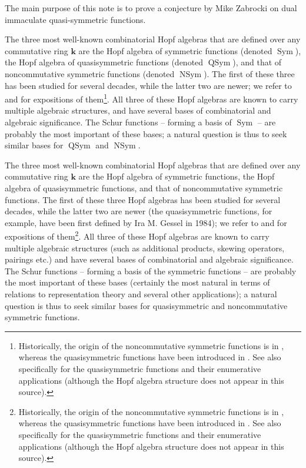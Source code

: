 \documentclass[numbers=enddot,12pt,final,onecolumn,notitlepage,abstracton]{scrartcl}%
\theoremstyle{definition}
\newenvironment{verlong}{}{}
\newenvironment{vershort}{}{}
\newenvironment{noncompile}{}{}
\begin{document}
\begin{noncompile}
The main purpose of this note is to prove a conjecture by Mike Zabrocki on
dual immaculate quasi-symmetric functions.
\end{noncompile}

\begin{vershort}
The three most well-known combinatorial Hopf algebras that are defined over
any commutative ring $\mathbf{k}$ are the Hopf algebra of symmetric functions
(denoted $\operatorname*{Sym}$), the Hopf algebra of quasisymmetric functions
(denoted $\operatorname*{QSym}$), and that of noncommutative symmetric
functions (denoted $\operatorname*{NSym}$). The first of these three has been
studied for several decades, while the latter two are newer; we refer to
\cite[Chapters 4 and 6]{HGK} and \cite[Chapters 2 and 5]{Reiner} for
expositions of them\footnote{Historically, the origin of the noncommutative
symmetric functions is in \cite{NCSF1}, whereas the quasisymmetric functions
have been introduced in \cite{Gessel}. See also \cite[Section 7.19]%
{Stanley-EC2} specifically for the quasisymmetric functions and their
enumerative applications (although the Hopf algebra structure does not appear
in this source).}. All three of these Hopf algebras are known to carry
multiple algebraic structures, and have several bases of combinatorial and
algebraic significance. The Schur functions -- forming a basis of
$\operatorname*{Sym}$ -- are probably the most important of these bases; a
natural question is thus to seek similar bases for $\operatorname*{QSym}$ and
$\operatorname*{NSym}$.
\end{vershort}

\begin{verlong}
The three most well-known combinatorial Hopf algebras that are defined over
any commutative ring $\mathbf{k}$ are the Hopf algebra of symmetric functions,
the Hopf algebra of quasisymmetric functions, and that of noncommutative
symmetric functions. The first of these three Hopf algebras has been studied
for several decades, while the latter two are newer (the quasisymmetric
functions, for example, have been first defined by Ira M. Gessel in 1984); we
refer to \cite[Chapters 4 and 6]{HGK} and \cite[Chapters 2 and 5]{Reiner} for
expositions of them\footnote{Historically, the origin of the noncommutative
symmetric functions is in \cite{NCSF1}, whereas the quasisymmetric functions
have been introduced in \cite{Gessel}. See also \cite[Section 7.19]%
{Stanley-EC2} specifically for the quasisymmetric functions and their
enumerative applications (although the Hopf algebra structure does not appear
in this source).}. All three of these Hopf algebras are known to carry
multiple algebraic structures (such as additional products, skewing operators,
pairings etc.) and have several bases of combinatorial and algebraic
significance. The Schur functions -- forming a basis of the symmetric
functions -- are probably the most important of these bases (certainly the
most natural in terms of relations to representation theory and several other
applications); a natural question is thus to seek similar bases for
quasisymmetric and noncommutative symmetric functions.
\end{verlong}
\end{document}
